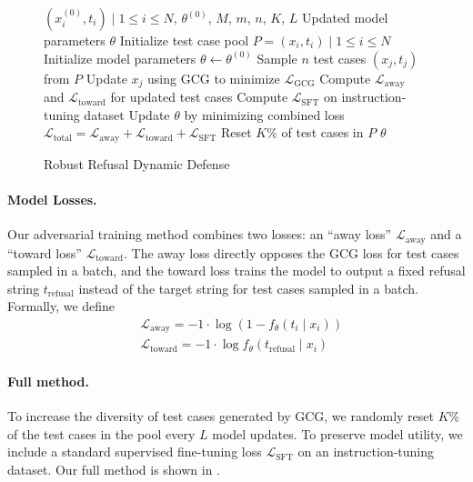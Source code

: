 \begin{figure}
\begin{algorithm}[H]
\caption{Robust Refusal Dynamic Defense}
\label{algorithm:R2D2}
\begin{algorithmic}
 ${(x_i^{(0)}, t_i) \mid 1 \leq i \leq N}$, $\theta^{(0)}$, $M$, $m$, $n$, $K$, $L$
 Updated model parameters $\theta$
\STATE Initialize test case pool $P = {(x_i, t_i) \mid 1 \leq i \leq N}$
\STATE Initialize model parameters $\theta \leftarrow \theta^{(0)}$
\STATE Sample $n$ test cases ${(x_j, t_j)}$ from $P$
\STATE Update $x_j$ using GCG to minimize $\mathcal{L}_\text{GCG}$
\ENDFOR
\ENDFOR
\STATE Compute $\mathcal{L}_\text{away}$ and $\mathcal{L}_\text{toward}$ for updated test cases
\STATE Compute $\mathcal{L}_\text{SFT}$ on instruction-tuning dataset
\STATE Update $\theta$ by minimizing combined loss\\\qquad\qquad$\mathcal{L}_\text{total} = \mathcal{L}_\text{away} + \mathcal{L}_\text{toward} + \mathcal{L}_\text{SFT}$
\STATE Reset $K\%$ of test cases in $P$
\ENDIF
\ENDFOR
{} $\theta$
\end{algorithmic}
\end{algorithm}
\end{figure}

\paragraph{Model Losses.}
Our adversarial training method combines two losses: an ``away loss'' $\mathcal{L}_\text{away}$ and a ``toward loss'' $\mathcal{L}_\text{toward}$. The away loss directly opposes the GCG loss for test cases sampled in a batch, and the toward loss trains the model to output a fixed refusal string $t_\text{refusal}$ instead of the target string for test cases sampled in a batch. Formally, we define
\begin{align*}
    &\mathcal{L}_\text{away} = -1 \cdot \log \left( 1 - f_\theta(t_i \mid x_i) \right) \\
    &\mathcal{L}_\text{toward} = -1 \cdot \log f_\theta(t_\text{refusal} \mid x_i)
\end{align*}

\paragraph{Full method.}
To increase the diversity of test cases generated by GCG, we randomly reset $K\%$ of the test cases in the pool every $L$ model updates. To preserve model utility, we include a standard supervised fine-tuning loss $\mathcal{L}_\text{SFT}$ on an instruction-tuning dataset. Our full method is shown in .

